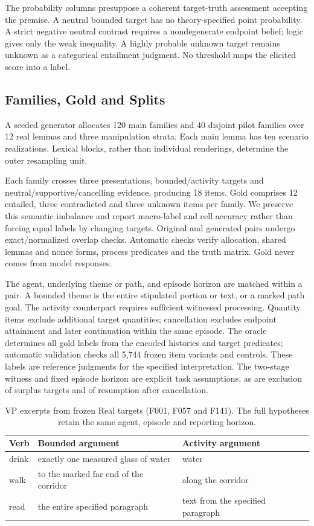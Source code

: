 \documentclass[sigconf,anonymous,review]{acmart}
\begin{document}
The probability columns presuppose a coherent target-truth assessment accepting the premise. A neutral bounded target has no theory-specified point probability. A strict negative neutral contrast requires a nondegenerate endpoint belief; logic gives only the weak inequality. A highly probable unknown target remains unknown as a categorical entailment judgment. No threshold maps the elicited score into a label.

\subsection{Families, Gold and Splits}
A seeded generator allocates 120 main families and 40 disjoint pilot families over 12 real lemmas and three manipulation strata. Each main lemma has ten scenario realizations. Lexical blocks, rather than individual renderings, determine the outer resampling unit.

Each family crosses three presentations, bounded/activity targets and neutral/supportive/cancelling evidence, producing 18 items. Gold comprises 12 entailed, three contradicted and three unknown items per family. We preserve this semantic imbalance and report macro-label and cell accuracy rather than forcing equal labels by changing targets. Original and generated pairs undergo exact/normalized overlap checks. Automatic checks verify allocation, shared lemmas and nonce forms, process predicates and the truth matrix. Gold never comes from model responses.

The agent, underlying theme or path, and episode horizon are matched within a pair. A bounded theme is the entire stipulated portion or text, or a marked path goal. The activity counterpart requires sufficient witnessed processing. Quantity items exclude additional target quantities; cancellation excludes endpoint attainment and later continuation within the same episode. The oracle determines all gold labels from the encoded histories and target predicates; automatic validation checks all 5,744 frozen item variants and controls. These labels are reference judgments for the specified interpretation. The two-stage witness and fixed episode horizon are explicit task assumptions, as are exclusion of surplus targets and of resumption after cancellation.

\begin{table}[t]
\centering
\caption{VP excerpts from frozen Real targets (F001, F057 and F141). The full hypotheses retain the same agent, episode and reporting horizon.}
\label{tab:vp_examples}
\setlength{\tabcolsep}{3pt}
\begin{tabular}{@{}l>{\raggedright\arraybackslash}p{}>{\raggedright\arraybackslash}p{}@{}}
\toprule
Verb & Bounded argument & Activity argument\\
\midrule
drink & exactly one measured glass of water & water\\
walk & to the marked far end of the corridor & along the corridor\\
read & the entire specified paragraph & text from the specified paragraph\\
\bottomrule
\end{tabular}
\end{table}
\end{document}
